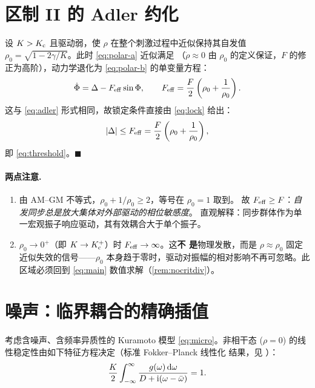 \section{区制 II 的 Adler 约化}
\label{app:regimeII}

设 $K>K_{\mathrm{c}}$ 且驱动弱，使 $\rho$ 在整个刺激过程中近似保持其自发值
$\rho_{0}=\sqrt{1-2\gamma/K}$。此时 \cref{eq:polar-a} 近似满足
（$\dot\rho\approx0$ 由 $\rho_0$ 的定义保证，$F$ 的修正为高阶），动力学退化为
\cref{eq:polar-b} 的单变量方程：
%
\begin{equation}
\dot\Phi=\Delta-F_{\mathrm{eff}}\sin\Phi ,
\qquad
F_{\mathrm{eff}}=\frac{F}{2}\left(\rho_{0}+\frac{1}{\rho_{0}}\right).
\end{equation}
%
这与 \cref{eq:adler} 形式相同，故锁定条件直接由 \cref{eq:lock} 给出：
%
\begin{equation}
|\Delta|\le F_{\mathrm{eff}}=\frac{F}{2}\left(\rho_{0}+\frac{1}{\rho_{0}}\right),
\end{equation}
%
即 \cref{eq:threshold}。\hfill$\blacksquare$

\paragraph{两点注意.}
\begin{enumerate}[leftmargin=2.2em,itemsep=2pt]
\item 由 AM--GM 不等式，$\rho_{0}+1/\rho_{0}\ge2$，等号在 $\rho_{0}=1$ 取到。
      故 $F_{\mathrm{eff}}\ge F$：\emph{自发同步总是放大集体对外部驱动的相位敏感度}。
      直观解释：同步群体作为单一宏观振子响应驱动，其有效耦合大于单个振子。
\item $\rho_{0}\to0^{+}$（即 $K\to K_{\mathrm{c}}^{+}$）时 $F_{\mathrm{eff}}\to\infty$。这\textbf{不
      是}物理发散，而是 $\rho\approx\rho_0$ 固定近似失效的信号——$\rho_0$
      本身趋于零时，驱动对振幅的相对影响不再可忽略。此区域必须回到
      \cref{eq:main} 数值求解（\cref{rem:nocritdiv}）。
\end{enumerate}

\section{噪声：临界耦合的精确插值}
\label{app:noise}

考虑含噪声、含频率异质性的 Kuramoto 模型 \cref{eq:micro}。非相干态
($\rho=0$) 的线性稳定性由如下特征方程决定（标准 Fokker--Planck 线性化
结果，见 \citealp{Strogatz2000}）：
%
\begin{equation}
\frac{K}{2}\int_{-\infty}^{\infty}
\frac{g(\omega)\,\mathrm{d}\omega}{D+\mathrm{i}(\omega-\bar{\omega})}=1 .
\label{eq:app-stab}
\end{equation}

